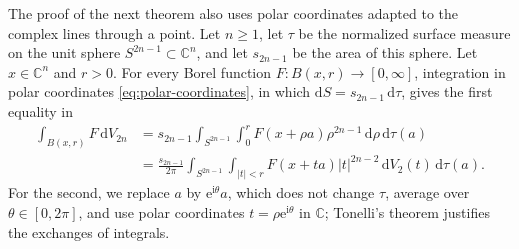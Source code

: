 The proof of the next theorem also uses polar coordinates adapted to the complex lines through a point. Let $n\geq1$, let $\tau$ be the normalized surface measure on the unit sphere $S^{2n-1}\subset\mathbb{C}^n$, and let $s_{2n-1}$ be the area of this sphere. Let $x\in\mathbb{C}^n$ and $r>0$. For every Borel function $F\colon B(x,r)\to[0,\infty]$, integration in polar coordinates \eqref{eq:polar-coordinates}, in which $\mathrm dS=s_{2n-1}\,\mathrm d\tau$, gives the first equality in
\begin{equation}\label{eq:complex-line-polar-coordinates}
 \begin{split}
 \int_{B(x,r)}F\,\mathrm{d}V_{2n}
 &=s_{2n-1}\int_{S^{2n-1}}\int_0^rF(x+\rho a)\rho^{2n-1}\,\mathrm{d}\rho\,\mathrm{d}\tau(a)\\
 &=\frac{s_{2n-1}}{2\pi}\int_{S^{2n-1}}\int_{|t|<r}
      F(x+ta)|t|^{2n-2}\,\mathrm{d}V_2(t)\,\mathrm{d}\tau(a).
 \end{split}
\end{equation}
For the second, we replace $a$ by $\mathrm{e}^{\mathrm{i}\theta}a$, which does not change $\tau$, average over $\theta\in[0,2\pi]$, and use polar coordinates $t=\rho\mathrm{e}^{\mathrm{i}\theta}$ in $\mathbb{C}$; Tonelli's theorem justifies the exchanges of integrals.

